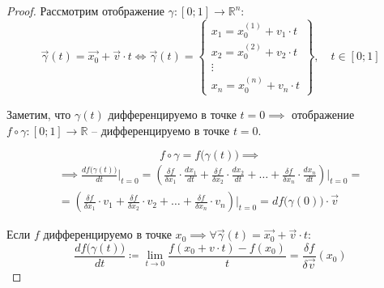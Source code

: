 \begin{proof}
    Рассмотрим отображение $\gamma:[0;1]\rightarrow \mathbb{R}^n$:
    \[
        \vec{\gamma}(t) = \vec{x_0} + \vec{v}\cdot t \iff \vec{\gamma}(t) = \left\{\begin{array}{l}
            x_1 = x_0^{(1)} + v_1 \cdot t \\
            x_2 = x_0^{(2)} + v_2 \cdot t \\
            \vdots                        \\
            x_n = x_0^{(n)} + v_n \cdot t
        \end{array}\right\}, \quad t \in [0;1]
    \]

    Заметим, что $\gamma(t)$ дифференцируемо в точке $t = 0 \implies$ отображение $f \circ \gamma:[0;1]\rightarrow\mathbb{R}$ -- дифференцируемо в точке $t = 0$.

    \[
        f\circ\gamma = f\big(\gamma(t)\big) \implies
    \]
    \begin{multline*}
        \implies \frac{df\big(\gamma(t)\big)}{dt}\bigg|_{t=0} = \left(\frac{\delta f}{\delta x_1} \cdot \frac{d x_1}{dt} + \frac{\delta f}{\delta x_2}\cdot\frac{dx_2}{dt} + \ldots + \frac{\delta f}{\delta x_n}\cdot\frac{dx_n}{dt}\right)\bigg|_{t=0} = \\
        = \left(\frac{\delta f}{\delta x_1} \cdot v_1 + \frac{\delta f}{\delta x_2} \cdot v_2 + \ldots + \frac{\delta f}{\delta x_n} \cdot v_n\right)\bigg|_{t=0} = df\big(\gamma(0)\big)\cdot \vec{v}
    \end{multline*}

    Если $f$ дифференцируемо в точке $x_0 \implies \forall \vec{\gamma}(t) = \vec{x_0} + \vec{v}\cdot t$:
    \[
        \frac{df\big(\gamma(t)\big)}{dt} \coloneqq \underset{t\rightarrow0}{\lim}\frac{f(x_0 + v\cdot t) - f(x_0)}{t} = \frac{\delta f}{\delta \vec{v}}(x_0)
    \]
\end{proof}
